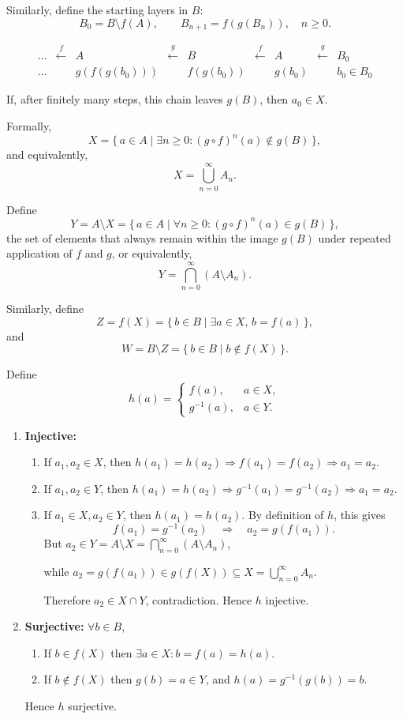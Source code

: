 \documentclass[12pt,a4paper,openany]{article}
\begin{document}
Similarly, define the starting layers in $B$:
\[
B_0 = B \setminus f(A), \qquad
B_{n+1} = f(g(B_n)), \quad n \ge 0.
\]

\[
\begin{array}{ccccccccc}
\dots & \xleftarrow{\,f\,} & A & \xleftarrow{\,g\,} & B & \xleftarrow{\,f\,} & A & \xleftarrow{\,g\,} & {B_0} \\
\dots & & g(f(g(b_0))) & & f(g(b_0)) & & g(b_0) & & b_0 \in B_0
\end{array}
\]

If, after finitely many steps, this chain leaves $g(B)$, then $a_0 \in X$.  

Formally,
\[
X = \{\, a \in A \mid \exists n \ge 0 : (g \circ f)^n(a) \notin g(B) \,\},
\]
and equivalently,
\[
X = \bigcup_{n=0}^{\infty} A_n.
\]

Define
\[
Y = A \setminus X = \{\, a \in A \mid \forall n \ge 0 : (g \circ f)^n(a) \in g(B) \,\},
\]
the set of elements that always remain within the image $g(B)$ under repeated application of $f$ and $g$, or equivalently,
\[
Y = \bigcap_{n=0}^{\infty} (A \setminus A_n).
\]

Similarly, define
\[
Z = f(X) = \{\, b \in B \mid \exists a \in X,\, b = f(a) \,\},
\]
and
\[
W = B \setminus Z = \{\, b \in B \mid b \notin f(X) \,\}.
\]

Define
\[
h(a) =
\begin{cases}
f(a), & a \in X, \\[2mm]
g^{-1}(a), & a \in Y.
\end{cases}
\]

\begin{enumerate}
\item \textbf{Injective:}  
    \begin{enumerate}
    \item If $a_1,a_2 \in X$, then $h(a_1)=h(a_2)\Longrightarrow f(a_1)=f(a_2)\Longrightarrow a_1=a_2$.  
    \item If $a_1,a_2 \in Y$, then $h(a_1)=h(a_2)\Longrightarrow g^{-1}(a_1)=g^{-1}(a_2)\Longrightarrow a_1=a_2$.  
    \item If $a_1\in X, a_2\in Y$, then $h(a_1)=h(a_2)$. By definition of $h$, this gives
    \[
    f(a_1) = g^{-1}(a_2) \quad \Longrightarrow \quad a_2 = g(f(a_1)).
    \]
    But $a_2 \in Y = A \setminus X = \displaystyle\bigcap_{n=0}^{\infty} (A \setminus A_n)$, 
    
    while $a_2 = g(f(a_1)) \in g(f(X)) \subseteq X = \displaystyle\bigcup_{n=0}^{\infty} A_n$.  

    Therefore $a_2 \in X \cap Y$, contradiction. Hence $h$ injective.
    \end{enumerate}
  

\item \textbf{Surjective:}  
    $\forall b\in B$,  
    \begin{enumerate}
    \item If $b\in f(X)$ then $\exists a\in X: b=f(a)=h(a)$.  
    \item If $b\notin f(X)$ then $g(b)=a\in Y$, and $h(a)=g^{-1}(g(b))=b$.  
    \end{enumerate}
    Hence $h$ surjective.
\end{enumerate}
\end{document}
